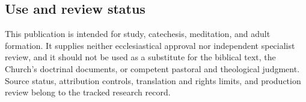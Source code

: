 {  \subsection{Use and review status}

  This publication is intended for study, catechesis, meditation, and adult
  formation.  It supplies neither ecclesiastical approval nor independent
  specialist review, and it should not be used as a substitute for the
  biblical text, the Church's doctrinal documents, or competent pastoral and
  theological judgment.  Source status, attribution controls, translation and
  rights limits, and production review belong to the tracked research record.}

\def\TriptychPrintEdition{}
